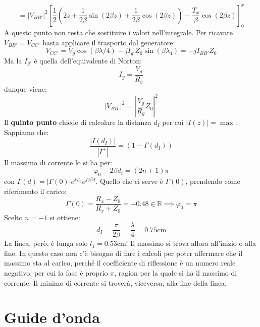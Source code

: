 \documentclass{book}
\begin{document}
    \begin{equation}
        =|V_{BB'}| ^{2}[\frac{1}{2}(2z+\frac{1}{2\beta}\sin(2\beta z)+\frac{1}{2\beta}\cos(2\beta z))-\frac{T_{x}}{\beta}\cos(2\beta z)]^{x} _{0}
    \end{equation}
    A questo punto non resta che sostituire i valori nell'integrale. Per ricavare $V_{BB'}=V_{CC'}$ basta applicare il trasporto dal generatore:
    \begin{equation}
        V_{CC'} = V_{g}\cos(\beta \lambda/4)-jI_{g'}Z_{0}\sin(\beta \lambda_{4}) = -jI_{BB'}Z_{0}
    \end{equation}
    Ma la $I_{g'}$ è quella dell'equivalente di Norton:
    \begin{equation}
        I_{g} = \frac{V_{g}}{R_{g}}
    \end{equation}
    dunque viene:
    \begin{equation}
        |V_{BB'}|^{2}=|\frac{V_{g}}{R_{g}}Z_{0}|^{2}
    \end{equation}
    Il \textbf{quinto punto} chiede di calcolare la distanza $d_{I}$ per cui $|I(z)|=\max$. Sappiamo che:
    \begin{equation}
        \frac{|I(d_{I})|}{|I^{+}|} = (1-\Gamma(d_{I}))
    \end{equation}
    Il massimo di corrente lo si ha per:
    \begin{equation}
        \varphi_{0}-2\beta d_{i} = (2n+1)\pi
    \end{equation}
    con $\Gamma(d) =|\Gamma(0)|e^{j\varphi_{0}}e^{j2\beta d}$. Quello che ci serve è $\Gamma(0)$, prendendo come riferimento il carico:
    \begin{equation}
        \Gamma(0) = \frac{R_{x}-Z_{0}}{R_{x}+Z_{0}} = -0.48 \in \mathbb{R} \implies \varphi_{0} = \pi
    \end{equation}
    Scelto $n=-1$ si ottiene:
    \begin{equation}
        d_{I} = \frac{\pi}{2\beta} = \frac{\lambda}{4} = 0.75\textrm{cm}
    \end{equation}
    La linea, però, è lunga solo $l_{1}=0.53\textrm{cm}$! Il massimo si trova allora all'inizio o alla fine.
    In questo caso non c'è bisogno di fare i calcoli per poter affermare che il massimo sta al carico, perché il coefficiente 
    di riflessione è un numero reale negativo, per cui la fase è proprio $\pi$, ragion per la quale si ha il massimo di corrente. Il minimo
    di corrente si troverà, viceversa, alla fine della linea.

    \newpage
    \section{Guide d'onda}
\end{document}
